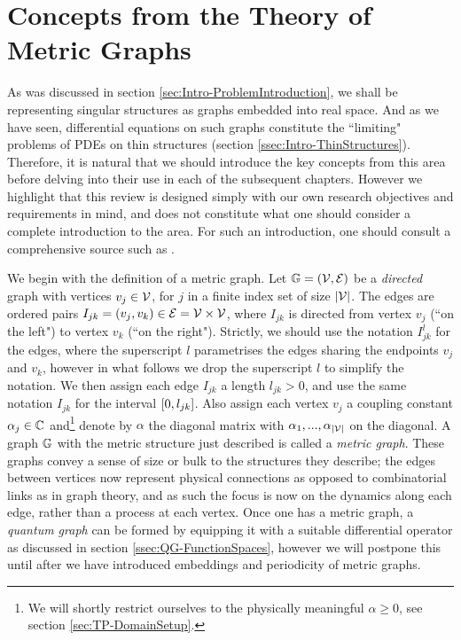 \section{Concepts from the Theory of Metric Graphs} \label{sec:QuantumGraphs}
As was discussed in section \ref{sec:Intro-ProblemIntroduction}, we shall be representing singular structures as graphs embedded into real space.
And as we have seen, differential equations on such graphs constitute the ``limiting" problems of PDEs on thin structures (section \ref{ssec:Intro-ThinStructures}).
Therefore, it is natural that we should introduce the key concepts from this area before delving into their use in each of the subsequent chapters.
However we highlight that this review is designed simply with our own research objectives and requirements in mind, and does not constitute what one should consider a complete introduction to the area.
For such an introduction, one should consult a comprehensive source such as \cite{berkolaiko2013introduction}.

We begin with the definition of a metric graph.
Let $\mathbb{G}=\left( \mathcal{V},\mathcal{E} \right)$ be a \emph{directed} graph with vertices $v_j\in \mathcal{V}$, for $j$ in a finite index set of size $\left\lvert \mathcal{V} \right\rvert$.
The edges are ordered pairs $I_{jk}=\left( v_j, v_k \right)\in \mathcal{E}=\mathcal{V}\times\mathcal{V}$, where $I_{jk}$ is directed from vertex $v_j$ (``on the left") to vertex $v_k$ (``on the right").
Strictly, we should use the notation $I_{jk}^l$ for the edges, where the superscript $l$ parametrises the edges sharing the endpoints $v_j$ and $v_k$, however in what follows we drop the superscript $l$ to simplify the notation.
We then assign each edge $I_{jk}$ a length $l_{jk}>0$, and use the same notation $I_{jk}$ for the interval $\left[ 0,l_{jk} \right]$.
Also assign each vertex $v_j$ a coupling constant $\alpha_j\in\mathbb{C}$ and\footnote{We will shortly restrict ourselves to the physically meaningful $\alpha\geq0$, see section \ref{sec:TP-DomainSetup}.} denote by $\alpha$ the diagonal matrix with $\alpha_1,...,\alpha_{\left\lvert \mathcal{V} \right\rvert}$ on the diagonal.
A graph $\mathbb{G}$ with the metric structure just described is called a \emph{metric graph}.
These graphs convey a sense of size or bulk to the structures they describe; the edges between vertices now represent physical connections as opposed to combinatorial links as in graph theory, and as such the focus is now on the dynamics along each edge, rather than a process at each vertex.
Once one has a metric graph, a \emph{quantum graph} can be formed by equipping it with a suitable differential operator as discussed in section \ref{ssec:QG-FunctionSpaces}, however we will postpone this until after we have introduced embeddings and periodicity of metric graphs.

